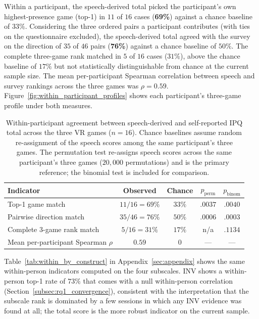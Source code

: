 Within a participant, the speech-derived total picked the participant's own highest-presence game (top-1) in $11$ of $16$ cases (\textbf{69\%}) against a chance baseline of $33\%$. Considering the three ordered pairs a participant contributes (with ties on the questionnaire excluded), the speech-derived total agreed with the survey on the direction of $35$ of $46$ pairs (\textbf{76\%}) against a chance baseline of $50\%$. The complete three-game rank matched in $5$ of $16$ cases ($31\%$), above the chance baseline of $17\%$ but not statistically distinguishable from chance at the current sample size. The mean per-participant Spearman correlation between speech and survey rankings across the three games was $\rho=0.59$. Figure~\ref{fig:within_participant_profiles} shows each participant's three-game profile under both measures.

\begin{table}[t]
\centering
\caption{Within-participant agreement between speech-derived and self-reported IPQ total across the three VR games ($n=16$). Chance baselines assume random re-assignment of the speech scores among the same participant's three games. The permutation test re-assigns speech scores across the same participant's three games ($20{,}000$ permutations) and is the primary reference; the binomial test is included for comparison.}
\label{tab:within_person}
\small
\begin{tabular}{lcccc}
\hline
Indicator & Observed & Chance & $p_{\mathrm{perm}}$ & $p_{\mathrm{binom}}$ \\
\hline
Top-1 game match & $11/16 = 69\%$ & $33\%$ & $.0037$ & $.0040$ \\
Pairwise direction match & $35/46 = 76\%$ & $50\%$ & $.0006$ & $.0003$ \\
Complete 3-game rank match & $5/16 = 31\%$ & $17\%$ & n/a & $.1134$ \\
Mean per-participant Spearman $\rho$ & $0.59$ & $0$ & --- & --- \\
\hline
\end{tabular}
\end{table}

Table~\ref{tab:within_by_construct} in Appendix~\ref{sec:appendix} shows the same within-person indicators computed on the four subscales. INV shows a within-person top-1 rate of $73\%$ that comes with a null within-person correlation (Section~\ref{subsec:rq1_convergence}), consistent with the interpretation that the subscale rank is dominated by a few sessions in which any INV evidence was found at all; the total score is the more robust indicator on the current sample.


